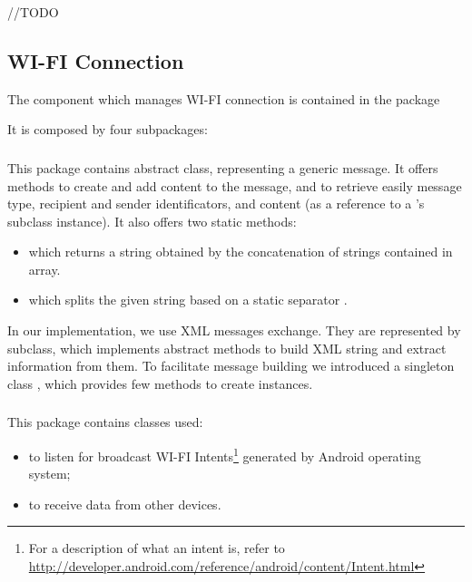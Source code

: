 //TODO

\subsection{WI-FI Connection}
The component which manages WI-FI connection is contained in the package 
\begin{center}
\end{center} 
It is composed by four subpackages:
	\\
	\subsubsection{}
	This package contains  abstract class, representing a generic message. It offers methods to create and add content to the message, and to retrieve easily message type, recipient and sender identificators, and content (as a reference to a 's subclass instance). It also offers two static methods:
	\begin{itemize}
		\item {} which returns a string obtained by the concatenation of strings contained in  array.
		\item {} which splits the given string based on a static separator . 
	\end{itemize}
	In our implementation, we use XML messages exchange. They are represented by  subclass, which implements  abstract methods to build XML string and extract information from them. To facilitate message building we introduced a singleton class , which provides few methods to create  instances.
	\hfill\\
	\subsubsection{}
	This package contains classes used:
	\begin{itemize}
		\item to listen for broadcast WI-FI Intents\footnote{For a description of what an intent is, refer to \url{http://developer.android.com/reference/android/content/Intent.html}} generated by Android operating system;
		\item to receive data from other devices.
	\end{itemize}
	
